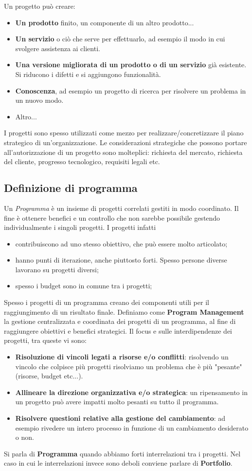 Un progetto può creare:
\begin{itemize}
	\item \textbf{Un prodotto} finito, un componente di un altro prodotto...
	\item \textbf{Un servizio} o ciò che serve per effettuarlo, ad esempio il modo in cui svolgere assistenza ai clienti.
	\item \textbf{Una versione migliorata di un prodotto o di un servizio} già esistente. Si riducono i difetti e si aggiungono funzionalità.
	\item \textbf{Conoscenza}, ad esempio un progetto di ricerca per risolvere un problema in un nuovo modo.
	\item Altro...
\end{itemize}
I progetti sono spesso utilizzati come mezzo per realizzare/concretizzare il piano strategico di un'organizzazione. Le considerazioni strategiche che possono portare all'autorizzazione di un progetto sono molteplici: richiesta del mercato, richiesta del cliente, progresso tecnologico, requisiti legali etc. 
\subsection{Definizione di programma}
Un \textit{Programma} è un insieme di progetti correlati gestiti in modo coordinato. Il fine è ottenere benefici e un controllo che non sarebbe possibile gestendo individualmente i singoli progetti.\newline
I progetti infatti
\begin{itemize}
	\item contribuiscono ad uno stesso obiettivo, che può essere molto articolato;
	\item hanno punti di iterazione, anche piuttosto forti. Spesso persone diverse lavorano su progetti diversi;
	\item spesso i budget sono in comune tra i progetti;
\end{itemize}
Spesso i progetti di un programma creano dei componenti utili per il raggiungimento di un risultato finale.\newline
Definiamo come \textbf{Program Management} la gestione centralizzata e coordinata dei progetti di un programma, al fine di raggiungere obiettivi e benefici strategici. Il focus e sulle interdipendenze dei progetti, tra queste vi sono:
\begin{itemize}
	\item \textbf{Risoluzione di vincoli legati a risorse e/o conflitti}: risolvendo un vincolo che colpisce più progetti risolviamo un problema che è più "pesante" (risorse, budget etc...).
	\item \textbf{Allineare la direzione organizzativa e/o strategica}: un ripensamento in un progetto può avere impatti molto pesanti su tutto il programma.
	\item \textbf{Risolvere questioni relative alla gestione del cambiamento}: ad esempio rivedere un intero processo in funzione di un cambiamento desiderato o non.
\end{itemize}
Si parla di \textbf{Programma} quando abbiamo forti interrelazioni tra i progetti. Nel caso in cui le interrelazioni invece sono deboli conviene parlare di \textbf{Portfolio}.
